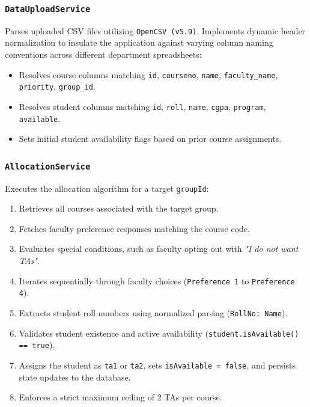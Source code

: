 \documentclass[12pt, a4paper]{article}
\begin{document}
\subsubsection{\texttt{DataUploadService}}
Parses uploaded CSV files utilizing \texttt{OpenCSV (v5.9)}. Implements dynamic header normalization to insulate the application against varying column naming conventions across different department spreadsheets:
\begin{itemize}[noitemsep]
    \item Resolves course columns matching \texttt{id}, \texttt{courseno}, \texttt{name}, \texttt{faculty\_name}, \texttt{priority}, \texttt{group\_id}.
    \item Resolves student columns matching \texttt{id}, \texttt{roll}, \texttt{name}, \texttt{cgpa}, \texttt{program}, \texttt{available}.
    \item Sets initial student availability flags based on prior course assignments.
\end{itemize}

\subsubsection{\texttt{AllocationService}}
Executes the allocation algorithm for a target \texttt{groupId}:
\begin{enumerate}[noitemsep]
    \item Retrieves all courses associated with the target group.
    \item Fetches faculty preference responses matching the course code.
    \item Evaluates special conditions, such as faculty opting out with \textit{"I do not want TAs"}.
    \item Iterates sequentially through faculty choices (\texttt{Preference 1} to \texttt{Preference 4}).
    \item Extracts student roll numbers using normalized parsing (\texttt{RollNo: Name}).
    \item Validates student existence and active availability (\texttt{student.isAvailable() == true}).
    \item Assigns the student as \texttt{ta1} or \texttt{ta2}, sets \texttt{isAvailable = false}, and persists state updates to the database.
    \item Enforces a strict maximum ceiling of 2 TAs per course.
\end{enumerate}
\end{document}
